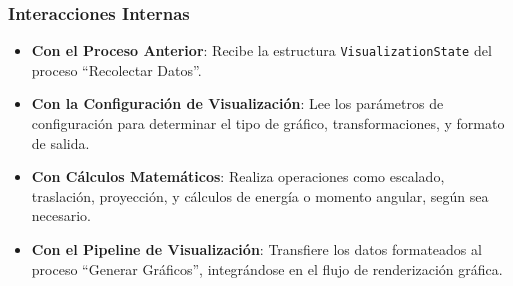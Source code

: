 \subsubsection{Interacciones Internas}
\begin{itemize}
    \item \textbf{Con el Proceso Anterior}: Recibe la estructura \texttt{VisualizationState} del proceso ``Recolectar Datos''.
    \item \textbf{Con la Configuración de Visualización}: Lee los parámetros de configuración para determinar el tipo de gráfico, transformaciones, y formato de salida.
    \item \textbf{Con Cálculos Matemáticos}: Realiza operaciones como escalado, traslación, proyección, y cálculos de energía o momento angular, según sea necesario.
    \item \textbf{Con el Pipeline de Visualización}: Transfiere los datos formateados al proceso ``Generar Gráficos'', integrándose en el flujo de renderización gráfica.
\end{itemize}
\newpage
